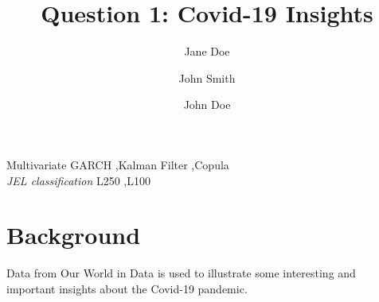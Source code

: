 \documentclass[11pt,preprint, authoryear]{elsarticle}
\numberwithin{equation}{section}
\numberwithin{figure}{section}
\numberwithin{table}{section}
\begin{document}
\begin{frontmatter}  %

\title{Question 1: Covid-19 Insights}





\author[Add1]{Jane Doe}

\author[Add1,Add2]{John Smith}

\author[Add1,Add2]{John Doe}



\address[Add1]{Some Institution, Cape Town, South Africa}
\address[Add2]{Some other Institution, Cape Town, South Africa}



\vspace{1cm}


\begin{keyword}
\footnotesize{
Multivariate GARCH \sep Kalman Filter \sep Copula \\
\vspace{0.3cm}
}
\footnotesize{
\textit{JEL classification} L250 \sep L100
}
\end{keyword}



\vspace{0.5cm}

\end{frontmatter}

\setcounter{footnote}{0}



\pagestyle{fancy}
\chead{}
\rhead{}
\lfoot{}
\lhead{}
\cfoot{}


\headsep 35pt %




\hypertarget{background}{%
\section{\texorpdfstring{Background
\label{-}}{Background }}\label{background}}

Data from Our World in Data is used to illustrate some interesting and
important insights about the Covid-19 pandemic.
\end{document}
